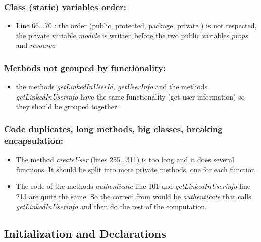 \subsubsection{Class (static) variables order:}
\begin{itemize}
\item Line 66...70 : the order (public, protected, package, private  ) is not respected, the private variable \textit{module} is written before the two public variables \textit{props} and \textit{resource}.
\end{itemize}

\subsubsection{Methods not grouped by functionality:}
\begin{itemize}
\item the methods  \textit{ getLinkedInUserId, getUserInfo} and the methods \textit{getLinkedInUserinfo} have the same functionality (get user information)  so they should be grouped together.
\end{itemize}
\subsubsection{Code duplicates, long methods, big classes, breaking encapsulation:}
\begin{itemize}
\item The method \textit{createUser} (lines   255...311) is too long and it does several functions. It should be split into more private methods, one for each function.
\item The code of the methods \textit{authenticate}  line 101 and \textit{getLinkedInUserinfo} line 213 are quite the same. So the correct from would be  \textit{authenticate} that calls \textit{getLinkedInUserinfo} and then do the  rest of the computation.
\end{itemize}

\subsection{Initialization and Declarations}
